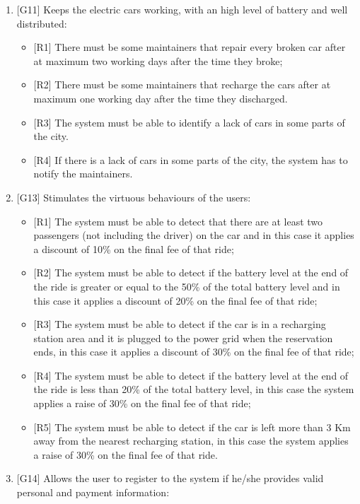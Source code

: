 \begin{enumerate}
\item {[G11]} Keeps the electric cars working, with an high level of battery and well distributed:

\begin{itemize}
	\item {[R1]} There must be some maintainers that repair every broken car after at maximum two working days after the time they broke;
	\item {[R2]} There must be some maintainers that recharge the cars after at maximum one working day after the time they discharged.
	\item {[R3]} The system must be able to identify a lack of cars in some parts of the city.
	\item {[R4]} If there is a lack of cars in some parts of the city, the system has to notify the maintainers.
\end{itemize}

\item {[G13]} Stimulates the virtuous behaviours of the users:

\begin{itemize}
	\item {[R1]} The system must be able to detect that there are at least two passengers (not including the driver) on the car and in this case it applies a discount of 10\% on the final fee of that ride;
	\item {[R2]} The system must be able to detect if the battery level at the end of the ride is greater or equal to the 50\% of the total battery level and in this case it applies a discount of 20\% on the final fee of that ride;
	\item {[R3]} The system must be able to detect if the car is in a recharging station area and it is plugged to the power grid when the reservation ends, in this case it applies a discount of 30\% on the final fee of that ride;
	\item {[R4]} The system must be able to detect if the battery level at the end of the ride is less than 20\% of the total battery level, in this case the system applies a raise of 30\% on the final fee of that ride;
	\item {[R5]} The system must be able to detect if the car is left more than 3 Km away from the nearest recharging station, in this case the system applies a raise of 30\% on the final fee of that ride.
\end{itemize}

\item {[G14]} Allows the user to register to the system if he/she provides valid personal and payment information:


\end{enumerate}
